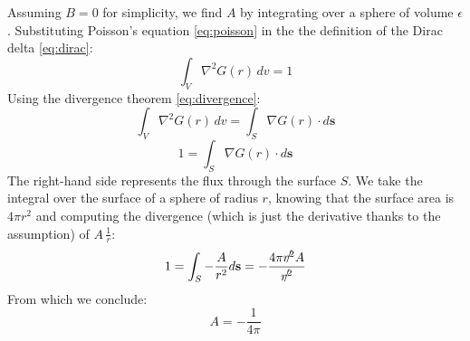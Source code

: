 Assuming \(B = 0\) for simplicity, we find \(A\) by integrating over a sphere of volume $\epsilon$.
Substituting Poisson's equation \ref{eq:poisson} in the the definition of the Dirac delta \ref{eq:dirac}:
\[
\int_V \nabla^2 G(r) \, dv = 1 
\]
Using the divergence theorem \ref{eq:divergence}:
\[
\int_V \nabla^2 G(r) \, dv = \int_S \nabla G(r) \cdot d\mathbf{s} 
\]
\[
1 = \int_S \nabla G(r) \cdot d\mathbf{s} 
\]
The right-hand side represents the flux through the surface \(S\). We take the integral over the surface of a sphere of radius \(r\), knowing that the surface area is \(4 \pi r^2\) and computing the divergence (which is just the derivative thanks to the assumption) of $A \, \frac{1}{r}$:
\[
1 = \int_S - \frac{A}{r^2} d\mathbf{s} = - \frac{4 \pi \slashed{r^2} A}{\slashed{r^2}}
\]
From which we conclude:
\[
A = - \frac{1}{4 \pi}
\]












